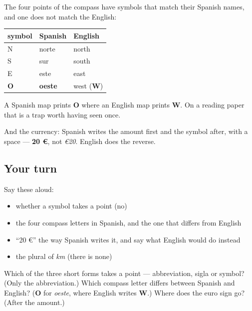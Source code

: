 \begin{grammarlens}[title={Grammar Lens: the compass, and where the euro goes}]
The four points of the compass have symbols that match their Spanish names, and one does not match the English:

\noindent
\begin{tabularx}{\linewidth}{@{}>{\raggedright\arraybackslash}X>{\raggedright\arraybackslash}X>{\raggedright\arraybackslash}X@{}}
\toprule
\textbf{symbol} & \textbf{Spanish} & \textbf{English} \\
\midrule
N & norte & north \\
S & sur & south \\
E & este & east \\
\textbf{O} & \textbf{oeste} & west (\textbf{W}) \\
\bottomrule
\end{tabularx}

A Spanish map prints \textbf{O} where an English map prints \textbf{W}. On a reading paper that is a trap worth having seen once.

And the currency: Spanish writes the amount first and the symbol after, with a space — \textbf{20 €}, not \emph{€20}. English does the reverse.
\end{grammarlens}

\subsection*{Your turn}
Say these aloud:

\begin{itemize}
\raggedright
  \item whether a symbol takes a point (no)
  \item the four compass letters in Spanish, and the one that differs from English
  \item \textquotedblleft{}20 €\textquotedblright{} the way Spanish writes it, and say what English would do instead
  \item the plural of \emph{km} (there is none)
\end{itemize}

\begin{tcolorbox}[breakable,colback=teal!4,colframe=teal!35!black,title={Before you move on}]
Which of the three short forms takes a point — abbreviation, sigla or symbol? (Only the abbreviation.) Which compass letter differs between Spanish and English? (\textbf{O} for \emph{oeste}, where English writes \textbf{W}.) Where does the euro sign go? (After the amount.)
\end{tcolorbox}
